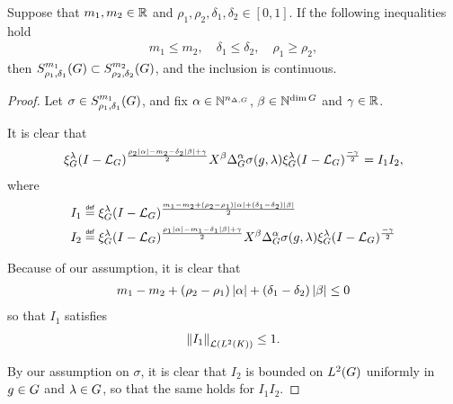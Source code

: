 \begin{lemma}
    Suppose that $m_1, m_2 \in \R$ and $\rho_1, \rho_2, \delta_1, \delta_2 \in [0, 1]$.
    If the following inequalities hold
    \begin{align*}
        m_1 \leq m_2, \quad \delta_1 \leq \delta_2, \quad \rho_1 \geq \rho_2,
    \end{align*}
    then $\SymbolClass {m_1} {\rho_1, \delta_1} \subset \SymbolClass {m_2} {\rho_2, \delta_2}$,
    and the inclusion is continuous.
\end{lemma}
\begin{proof}
    Let $\sigma \in \SymbolClass {m_1} {\rho_1, \delta_1}$,
    and fix $\alpha \in \N^{\dimDifferenceOperators}$, $\beta \in \N^{\dim \Group}$ and $\gamma \in \R$.

    It is clear that
    \begin{align*}
        \Rep{\lambda} \BesselPotential{\rho_2 \abs\alpha - m_2 - \delta_2 \abs\beta + \gamma}
        \LeftDifferentialOperator{\beta} \DifferenceOperatorOrder{\alpha} \sigma(g, \lambda)
        \Rep{\lambda} \BesselPotential{-\gamma}
        = I_1 I_2,
    \end{align*}
    where
    \begin{align*}
        I_1 &\defeq \Rep \lambda \BesselPotential {m_1 - m_2 + (\rho_2 - \rho_1) \abs \alpha + (\delta_1 - \delta_2) \abs \beta}\\
        I_2 &\defeq \Rep{\lambda} \BesselPotential{\rho_1 \abs\alpha - m_1 - \delta_1 \abs\beta + \gamma}
        \LeftDifferentialOperator{\beta} \DifferenceOperatorOrder{\alpha} \sigma(g, \lambda)
        \Rep{\lambda} \BesselPotential{-\gamma}
    \end{align*}

    Because of our assumption,
    it is clear that
    \begin{align*}
        m_1 - m_2 + (\rho_2 - \rho_1) \abs \alpha + (\delta_1 - \delta_2) \abs \beta \leq 0
    \end{align*}
    so that $I_1$ satisfies
    \begin{align*}
        \norm [\Lin {\Lebesgue 2 \CompactGroup}] {I_1}
        \leq 1.
    \end{align*}

    By our assumption on $\sigma$,
    it is clear that $I_2$ is bounded on $\Lebesgue 2 \Group$ uniformly in $g \in \Group$ and $\lambda \in \Group$,
    so that the same holds for $I_1 I_2$.
\end{proof}

